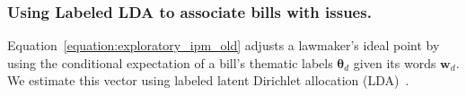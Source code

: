



\subsubsection{Using Labeled LDA to associate bills with issues.}
\label{section:lda}

Equation~\ref{equation:exploratory_ipm_old} adjusts a lawmaker's ideal
point by using the conditional expectation of a bill's thematic labels
$\bm \theta_d$ given its words $\bm w_d$.  We estimate this vector
using labeled latent Dirichlet allocation (LDA)~\cite{ramage:2009}.

